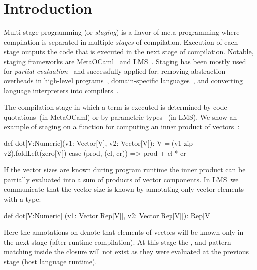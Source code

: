 \section{Introduction}
\label{sct:introduction}


 Multi-stage programming (or \emph{staging}) is a flavor of meta-programming where compilation is
  separated in multiple \emph{stages} of compilation. Execution of each stage outputs
  the code that is executed in the next stage of compilation. Notable, staging frameworks
  are MetaOCaml~\cite{taha_multi-stage_1997} and LMS~\cite{rompf2012lightweight}.
  Staging has been mostly used for \emph{partial evaluation}~\cite{jones1993partial}
  and successfully applied for: removing abstraction overheads in high-level
  programs~\cite{carette2005multi,rompf2012lightweight}, domain-specific
  languages~\cite{jonnalagedda2014staged}, and converting language
  interpreters into compilers~\cite{lancet}.

The compilation stage in which a term is executed is determined by code
 quotations~(in MetaOCaml) or by parametric types ~(in LMS). We show an
 example of staging on a function for computing an inner product of
 vectors~\footnotemark[1]:\begin{lstparagraph}
  def dot[V:Numeric](v1: Vector[V], v2: Vector[V]): V =
    (v1 zip v2).foldLeft(zero[V]) {
      case (prod, (cl, cr)) => prod + cl * cr
    }
 \end{lstparagraph}

If the vector sizes are known during program runtime the inner product can
 be partially evaluated into a sum of products of vector components.
 In LMS~\footnotemark[2] we communicate that the vector size is known by annotating
 only vector elements with a  type:\begin{lstparagraph}
  def dot[V:Numeric]
    (v1: Vector[Rep[V]], v2: Vector[Rep[V]]): Rep[V]
 \end{lstparagraph}

Here the  annotations on  denote that elements of vectors will be known
 only in the next stage (after runtime compilation). At this stage the 
 , and pattern matching inside the closure will not exist
 as they were evaluated at the previous stage (host language runtime).

